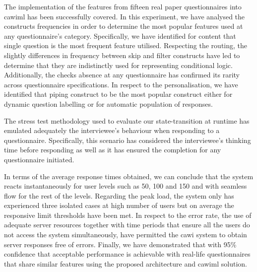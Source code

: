 	The implementation of the features from fifteen real paper questionnaires into \gls{cawiml} has been successfully covered. In this experiment, we have analysed the constructs frequencies in order to determine the most popular features used at any questionnaire's category. Specifically, we have identified for content that single question is the most frequent feature utilised. Respecting the routing, the slightly differences in frequency between skip and filter constructs have led to determine that they are indistinctly used for representing conditional logic. Additionally, the checks absence at any questionnaire has confirmed its rarity across questionnaire specifications. In respect to the personalisation, we have identified that piping construct to be the most popular construct either for dynamic question labelling or for automatic population of responses.

	The stress test methodology used to evaluate our state-transition at runtime has emulated adequately the interviewee's behaviour when responding to a questionnaire. Specifically, this scenario has considered the interviewee's thinking time before responding as well as it has ensured the completion for any questionnaire initiated.

	In terms of the average response times obtained, we can conclude that the system reacts instantaneously for user levels such as 50, 100 and 150 and with seamless flow for the rest of the levels. Regarding the peak load, the system only has experienced three isolated cases at high number of users but on average the responsive limit thresholds have been met. In respect to the error rate, the use of adequate server resources together with time periods that ensure all the users do not access the system simultaneously, have permitted the \gls{cawi} system to obtain server responses free of errors. Finally, we have demonstrated that with 95\% confidence that acceptable performance is achievable with real-life questionnaires that share similar features using the proposed architecture and \gls{cawiml} solution. %